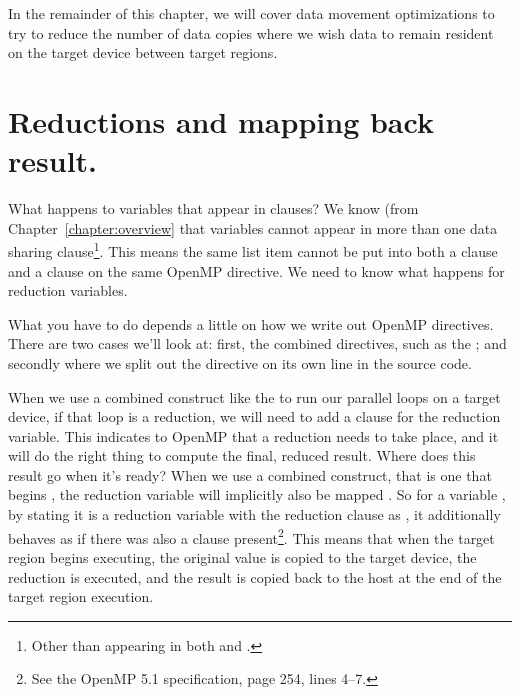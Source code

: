 In the remainder of this chapter, we will cover data movement optimizations to try to reduce the number of data copies where we wish data to remain resident on the target device between target regions.

\section{Reductions and mapping back result.}
\label{sec:target_reductions}

What happens to variables that appear in  clauses?
We know (from Chapter~\ref{chapter:overview} that variables cannot appear in more than one data sharing clause\footnote{Other than appearing in both  and .}.
This means the same list item cannot be put into both a  clause and a  clause on the same OpenMP directive.
We need to know what happens for reduction variables.

What you have to do depends a little on how we write out OpenMP directives.
There are two cases we'll look at: first, the combined directives, such as the \BUD; and secondly where we split out the  directive on its own line in the source code.

When we use a combined construct like the \BUD to run our parallel loops on a target device, if that loop is a reduction, we will need to add a  clause for the reduction variable.
This indicates to OpenMP that a reduction needs to take place, and it will do the right thing to compute the final, reduced result.
Where does this result go when it's ready?
When we use a combined construct, that is one that begins , the reduction variable will implicitly also be mapped .
So for a variable , by stating it is a reduction variable with the reduction clause as , it additionally behaves as if there was also a  clause present\footnote{See the OpenMP 5.1 specification, page 254, lines 4--7.}.
This means that when the target region begins executing, the original value is copied to the target device, the reduction is executed, and the result is copied back to the host at the end of the target region execution.


